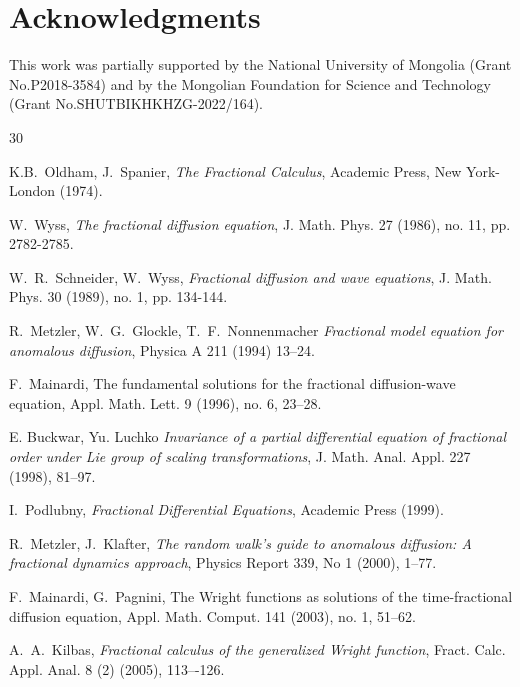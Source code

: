 \documentclass[12pt]{article}
\theoremstyle{definition}
\begin{document}
\section*{Acknowledgments}

This work was partially supported by the National University of Mongolia (Grant No.P2018-3584) and by the Mongolian
Foundation for Science and Technology (Grant
No.SHUTBIKHKHZG-2022/164). 



\begin{thebibliography}{30}

 K.B.~Oldham, J.~Spanier, \textit{The Fractional Calculus}, Academic Press, New York-London (1974).

 W.~Wyss, \textit{The fractional diffusion equation}, J. Math. Phys. 27 (1986), no. 11, pp. 2782-2785.
         
 W.~R.~Schneider, W.~Wyss, \textit{Fractional diffusion and wave  equations}, J. Math. Phys. 30 (1989), no. 1, pp. 134-144.

 R.~Metzler, W.~G.~Glockle, T.~F.~Nonnenmacher \textit{Fractional model equation for anomalous diffusion}, Physica A 211 (1994) 13--24.

 F.~Mainardi, The fundamental solutions for the fractional diffusion-wave equation, Appl. Math. Lett. 9 (1996), no. 6, 23--28.

 E. Buckwar, Yu. Luchko \textit{Invariance of a partial differential equation of fractional order under Lie group of scaling transformations}, J. Math. Anal. Appl. 227 (1998), 81–97.

I.~Podlubny, \textit{Fractional Differential Equations}, Academic Press (1999).

 R.~Metzler, J.~Klafter, \textit{The random walk’s guide to anomalous diffusion: A fractional dynamics approach}, Physics Report 339, No 1 (2000), 1–77.

 F.~Mainardi, G.~Pagnini, The Wright functions as solutions of the time-fractional diffusion equation, Appl. Math. Comput. 141 (2003), no. 1, 51--62.

 A.~A.~Kilbas, \textit{Fractional calculus of the generalized Wright function}, Fract. Calc. Appl. Anal. 8 (2) (2005), 113–-126.


\end{thebibliography}
\end{document}
